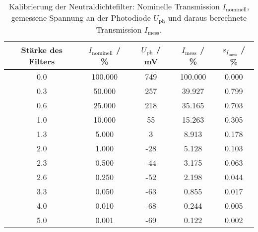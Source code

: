 \begin{table}[H]
\caption{Kalibrierung der Neutraldichtefilter: Nominelle Transmission $I_{\text{nominell}}$, gemessene Spannung an der Photodiode $U_{\text{ph}}$ und daraus berechnete Transmission $I_{\text{mess}}$. }
\begin{center}
\begin{tabular}{|c|c|c|c|c|}
  \hline
  Stärke des Filters & $I_\text{nominell}$ / \% & $U_\text{ph}$ / mV & $I_\text{mess}$ / \% & $s_{I_\text{mess}}$ / \% \\ \hline
  0.0 & 100.000 & 749 & 100.000 & 0.000 \\ \hline
  0.3 & 50.000 & 257 & 39.927 & 0.799 \\ \hline
  0.6 & 25.000 & 218 & 35.165 & 0.703 \\ \hline
  1.0 & 10.000 & 55 & 15.263 & 0.305 \\ \hline
  1.3 & 5.000 & 3 & 8.913 & 0.178 \\ \hline
  2.0 & 1.000 & -28 & 5.128 & 0.103 \\ \hline
  2.3 & 0.500 & -44 & 3.175 & 0.063 \\ \hline
  2.6 & 0.250 & -52 & 2.198 & 0.044 \\ \hline
  3.3 & 0.050 & -63 & 0.855 & 0.017 \\ \hline
  4.0 & 0.010 & -68 & 0.244 & 0.005 \\ \hline
  5.0 & 0.001 & -69 & 0.122 & 0.002 \\ \hline
\end{tabular}
\end{center}
\label{tab:deh:dnfilter}
\end{table}
